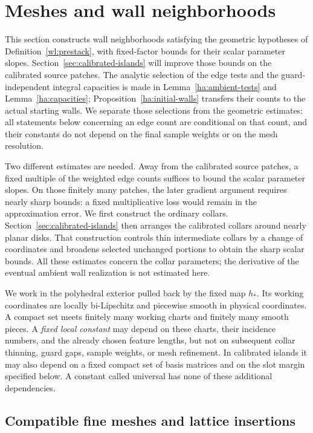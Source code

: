 \documentclass[11pt]{article}
\numberwithin{equation}{section}
\theoremstyle{definition}
\theoremstyle{remark}
\begin{document}
\section{Meshes and wall neighborhoods}
\label{sec:mesh}

This section constructs wall neighborhoods satisfying the geometric
hypotheses of Definition~\ref{wl:prestack}, with fixed-factor bounds
for their scalar parameter slopes.  Section~\ref{sec:calibrated-islands}
will improve those bounds on the calibrated source patches.
The analytic selection of the edge tests and the
guard-independent integral capacities is made in
Lemma~\ref{ha:ambient-tests} and Lemma~\ref{ha:capacities};
Proposition~\ref{ha:initial-walls} transfers their counts to the actual
starting walls.  We separate those
selections from the geometric estimates: all statements below concerning
an edge count are conditional on that count, and their constants do not
depend on the final sample weights or on the mesh resolution.

Two different estimates are needed.  Away from the calibrated source
patches, a fixed multiple of the weighted edge counts suffices to bound
the scalar parameter slopes.  On those finitely many patches, the
later gradient argument requires nearly sharp bounds: a fixed
multiplicative loss would remain in the approximation error.  We first
construct the ordinary collars.  Section~\ref{sec:calibrated-islands}
then arranges the calibrated collars around nearly planar disks.
That construction controls thin
intermediate collars by a change of coordinates and broadens selected
unchanged portions to obtain the sharp scalar bounds.  All these
estimates concern the collar parameters; the derivative of the eventual
ambient wall realization is not estimated here.

We work in the polyhedral exterior pulled back by the fixed map $h_*$.
Its working coordinates are locally bi-Lipschitz and piecewise smooth
in physical coordinates.  A compact set meets finitely many working
charts and finitely many smooth pieces.  A \emph{fixed local constant}
may depend on these charts, their incidence numbers, and the already
chosen feature lengths, but not on subsequent collar thinning, guard
gaps, sample weights, or mesh refinement.  In calibrated islands it may
also depend on a fixed compact set of basis matrices and on the slot
margin specified below.  A constant called universal has none of these
additional dependencies.

\subsection{Compatible fine meshes and lattice insertions}
\end{document}
